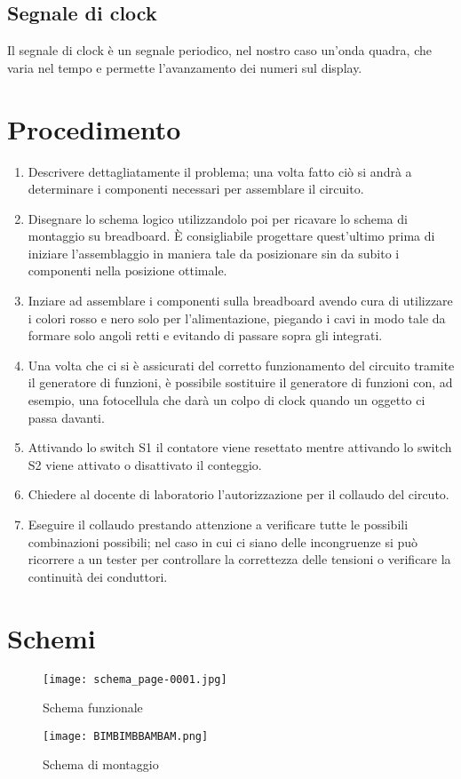 \documentclass[a4paper, 10pt]{RelazioneLab}
\begin{document}
\subsection{Segnale di clock}
Il segnale di clock è un segnale periodico, nel nostro caso un'onda quadra, che varia nel tempo e permette l'avanzamento dei numeri sul display.
\section{Procedimento}
    \begin{enumerate}
        \item Descrivere dettagliatamente il problema; una volta fatto ciò si andrà a determinare i componenti necessari per assemblare il circuito.
        \item Disegnare lo schema logico utilizzandolo poi per ricavare lo schema di montaggio su breadboard. È consigliabile progettare quest'ultimo prima di iniziare l'assemblaggio in maniera tale da posizionare sin da subito i componenti nella posizione ottimale.
        \item Inziare ad assemblare i componenti sulla breadboard avendo cura di utilizzare i colori rosso e nero solo per l'alimentazione, piegando i cavi in modo tale da formare solo angoli retti e evitando di passare sopra gli integrati. 
        \item Una volta che ci si è assicurati del corretto funzionamento del circuito tramite il generatore di funzioni, è possibile sostituire il generatore di funzioni con, ad esempio, una fotocellula che darà un colpo di clock quando un oggetto ci passa davanti.
        \item Attivando lo switch S1 il contatore viene resettato mentre attivando lo switch S2 viene attivato o disattivato il conteggio. 
        \item Chiedere al docente di laboratorio l'autorizzazione per il collaudo del circuto.
        \item Eseguire il collaudo prestando attenzione a verificare tutte le possibili combinazioni possibili; nel caso in cui ci siano delle incongruenze si può ricorrere a un tester per controllare la correttezza delle tensioni o verificare la continuità dei conduttori.
    \end{enumerate}
\section{Schemi}
\begin{figure}[H]
    \centering
    \texttt{[image: schema\_page-0001.jpg]}
    \caption{Schema funzionale}
    \label{fig:enter-label}
\end{figure}
\begin{figure}[H]
    \centering
    \texttt{[image: BIMBIMBBAMBAM.png]}
    \caption{Schema di montaggio}
    \label{fig:enter-label}
\end{figure}
\end{document}
